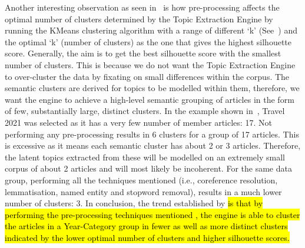 Another interesting observation as seen in~ is how pre-processing affects the optimal number of clusters determined by the Topic Extraction Engine by running the KMeans clustering algorithm with a range of different `k' (See~) and the optimal `k' (number of clusters) as the one that gives the highest silhouette score. Generally, the aim is to get the best silhouette score with the smallest number of clusters. This is because we do not want the Topic Extraction Engine to over-cluster the data by fixating on small differences within the corpus. The semantic clusters are derived for topics to be modelled within them, therefore, we want the engine to achieve a high-level semantic grouping of articles in the form of few, substantially large, distinct clusters. In the example shown in~, Travel 2021 was selected as it has a very few number of member articles: 17. Not performing any pre-processing results in 6 clusters for a group of 17 articles. This is excessive as it means each semantic cluster has about 2 or 3 articles. Therefore, the latent topics extracted from these will be modelled on an extremely small corpus of about 2 articles and will most likely be incoherent. For the same data group, performing all the techniques mentioned (i.e., coreference resolution, lemmatisation, named entity and stopword removal), results in a much lower number of clusters: 3. In conclusion, the trend established by  \hl{is that by performing the pre-processing techniques mentioned , the engine is able to cluster the articles in a Year-Category group in fewer as well as more distinct clusters indicated by the lower optimal number of clusters and higher silhouette scores.}



